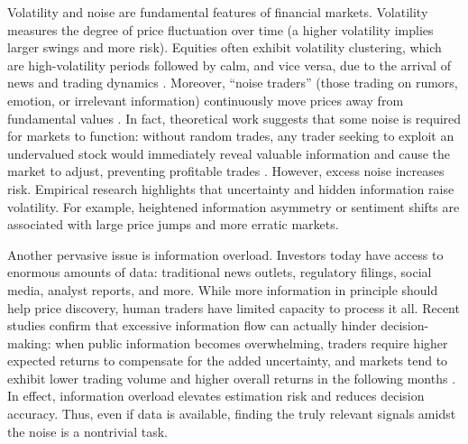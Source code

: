 Volatility and noise are fundamental features of financial markets. Volatility measures the degree of price fluctuation over time (a higher volatility implies larger swings and more risk). Equities often exhibit volatility clustering, which are high-volatility periods followed by calm, and vice versa, due to the arrival of news and trading dynamics \cite{Robert1982}. Moreover, “noise traders” (those trading on rumors, emotion, or irrelevant information) continuously move prices away from fundamental values \cite{DeLong1990}. In fact, theoretical work suggests that some noise is required for markets to function: without random trades, any trader seeking to exploit an undervalued stock would immediately reveal valuable information and cause the market to adjust, preventing profitable trades \cite{Grossman1980}. However, excess noise increases risk. Empirical research highlights that uncertainty and hidden information raise volatility. For example, heightened information asymmetry or sentiment shifts are associated with large price jumps and more erratic markets.

Another pervasive issue is information overload. Investors today have access to enormous amounts of data: traditional news outlets, regulatory filings, social media, analyst reports, and more. While more information in principle should help price discovery, human traders have limited capacity to process it all. Recent studies confirm that excessive information flow can actually hinder decision-making: when public information becomes overwhelming, traders require higher expected returns to compensate for the added uncertainty, and markets tend to exhibit lower trading volume and higher overall returns in the following months \cite{Bernales2023}. In effect, information overload elevates estimation risk and reduces decision accuracy. Thus, even if data is available, finding the truly relevant signals amidst the noise is a nontrivial task.


